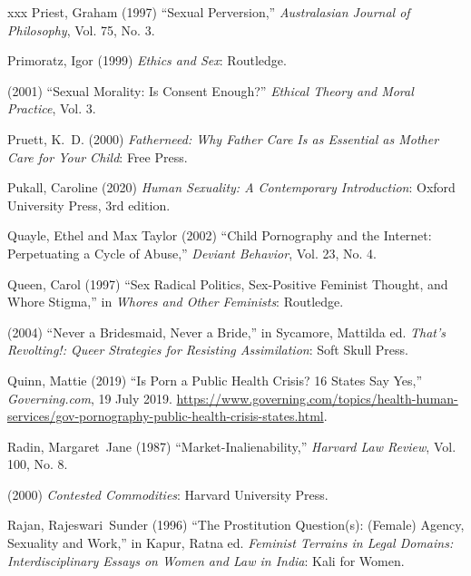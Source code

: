 \documentclass[]{jlreq} \usepackage{mystyle}
\begin{document}
\begin{thebibliography}{xxx}
Priest, Graham (1997) ``Sexual Perversion,'' \textit{ Australasian Journal of
  Philosophy}, Vol. 75, No. 3.

Primoratz, Igor (1999)  \textit{ Ethics and Sex}: Routledge.

 \bysame{}  (2001) ``Sexual Morality: Is Consent Enough?'' \textit{ Ethical
  Theory and Moral Practice}, Vol. 3.

Pruett, K.~D. (2000)  \textit{ Fatherneed: Why Father Care Is as Essential as
  Mother Care for Your Child}: Free Press.

Pukall, Caroline (2020)  \textit{ Human Sexuality: A Contemporary
  Introduction}: Oxford University Press, 3rd edition.

Quayle, Ethel and Max Taylor (2002) ``Child Pornography and the Internet:
  Perpetuating a Cycle of Abuse,'' \textit{ Deviant Behavior}, Vol. 23, No. 4.

Queen, Carol (1997) ``Sex Radical Politics, Sex-Positive Feminist Thought, and
  Whore Stigma,'' in  \textit{ Whores and Other Feminists}: Routledge.

 \bysame{}  (2004) ``Never a Bridesmaid, Never a Bride,'' in Sycamore, Mattilda
  ed.   \textit{ That's Revolting!: Queer Strategies for Resisting
  Assimilation}: Soft Skull Press.

Quinn, Mattie (2019) ``Is Porn a Public Health Crisis? 16 States Say Yes,''
  \emph{Governing.com}, 19 July 2019.
  \url{https://www.governing.com/topics/health-human-services/gov-pornography-public-health-crisis-states.html}.

Radin, Margaret~Jane (1987) ``Market-Inalienability,'' \textit{ Harvard Law
  Review}, Vol. 100, No. 8.

 \bysame{}  (2000)  \textit{ Contested Commodities}: Harvard University Press.

Rajan, Rajeswari~Sunder (1996) ``The Prostitution Question(s): (Female) Agency,
  Sexuality and Work,'' in Kapur, Ratna ed.   \textit{ Feminist Terrains in
  Legal Domains: Interdisciplinary Essays on Women and Law in India}: Kali for
  Women.


\end{thebibliography}
\end{document}
